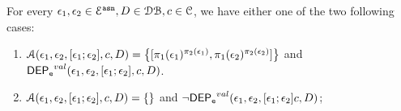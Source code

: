 %
\begin{lem}
\label{lem:inv_alg2}
For every $\mathtt{\epsilon}_1, \mathtt{\epsilon}_2 \in \mathcal{E}^{\mathtt{{asn}}}, D \in \mathcal{DB} , c \in \mathcal{C}$, we have either one of the two following cases:
\begin{enumerate}
  \item $\mathcal{A}(\event_1, \event_2,  [\event_1; \event_2], c, D) = 
  \left\{[\pi_1(\event_1)^{\pi_2(\event_1)}, \pi_1(\event_2)^{\pi_2(\event_2)}] \right \}$ 
  and $\mathsf{DEP_{\mathtt{e}}}^{val}(\mathtt{\epsilon}_1, \mathtt{\epsilon}_2, [\mathtt{\epsilon}_1; \mathtt{\epsilon}_2], c, D)$.
  \item  $\mathcal{A}(\mathtt{\epsilon}_1, \mathtt{\epsilon}_2, [\mathtt{\epsilon}_1; \mathtt{\epsilon}_2], c, D) = \{\}$ 
  and $\neg \mathsf{DEP_{\mathtt{e}}}^{val}(\mathtt{\epsilon}_1, \mathtt{\epsilon}_2, [\mathtt{\epsilon}_1; \mathtt{\epsilon}_2] c, D)$;
\end{enumerate}
\end{lem}
